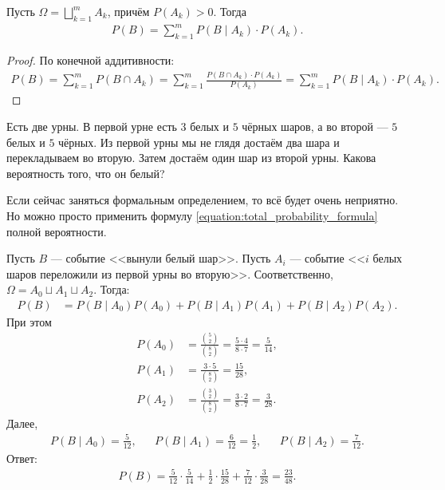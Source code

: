 \documentclass[../main.tex]{subfiles}
\begin{document}
\begin{prop}
 Пусть $\Omega = \bigsqcup_{k=1}^{m} A_k$, причём $P(A_k) > 0$. Тогда
 \begin{align}
  \label{equation:total_probability_formula}
  P(B) = \sum_{k=1}^{m} P(B \mid A_k) \cdot P(A_k)
 .\end{align} 
\end{prop}
\begin{proof} По конечной аддитивности:
 \begin{align*}
  P(B) = \sum_{k=1}^{m} P(B \cap A_k) = \sum_{k=1}^{m} \frac{P(B \cap A_k) \cdot P(A_k)}{P(A_k)} = \sum_{k=1}^{m} P(B \mid A_k) \cdot P(A_k).
 \end{align*} 
\end{proof}
\begin{exmpl*}
 Есть две урны. В первой урне есть $3$ белых и $5$ чёрных шаров, а во второй --- $5$ белых и $5$ чёрных. Из первой урны мы не глядя достаём два шара и перекладываем во вторую. Затем достаём один шар из второй урны. Какова вероятность того, что он белый?

 Если сейчас заняться формальным определением, то всё будет очень неприятно. Но можно просто применить формулу \eqref{equation:total_probability_formula} полной вероятности.

 Пусть $B$ --- событие <<вынули белый шар>>. Пусть $A_i$ --- событие <<$i$ белых шаров переложили из первой урны во вторую>>. Соответственно, $\Omega = A_0 \sqcup A_1 \sqcup A_2$. Тогда:
 \begin{align*}
  P(B) &= P(B \mid A_0) P(A_0) + P(B \mid A_1) P(A_1) + P(B \mid A_2) P(A_2).
 \end{align*} При этом 
 \begin{align*}
  P(A_0) &= \frac{\binom 5 2}{\binom 8 2} = \frac{5 \cdot 4}{8 \cdot 7} = \frac{5}{14}, \\
  P(A_1) &= \frac{3 \cdot 5}{\binom 8 2} = \frac{15}{28}, \\
  P(A_2) &= \frac{\binom 3 2}{\binom 8 2} = \frac{3 \cdot 2}{8 \cdot 7} = \frac{3}{28}.
 \end{align*} Далее,
 \begin{align*}
  P(B \mid A_0) = \frac{5}{12}, & &P(B \mid A_1) = \frac{6}{12} = \frac{1}{2}, & &P(B \mid A_2) = \frac{7}{12}
 .\end{align*} Ответ:
 \begin{align*}
  P(B)  = \frac{5}{12} \cdot \frac{5}{14} + \frac{1}{2} \cdot \frac{15}{28} + \frac{7}{12} \cdot \frac{3}{28} = \frac{23}{48}.
 \end{align*} 

\end{exmpl*}
\end{document}
